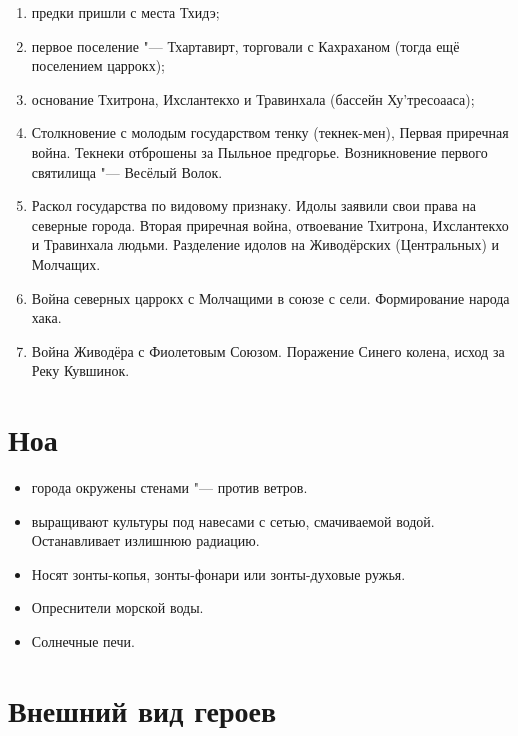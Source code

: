\documentclass[a4paper,10pt,fleqn]{book}
\begin{document}
\begin{enumerate}
\item предки пришли с места Тхидэ;
\item первое поселение "--- Тхартавирт, торговали с Кахраханом (тогда ещё поселением царрокх);
\item основание Тхитрона, Ихслантекхо и Травинхала (бассейн Ху'тресоааса);
\item Столкновение с молодым государством тенку (текнек-мен), Первая приречная война.
Текнеки отброшены за Пыльное предгорье.
Возникновение первого святилища "--- Весёлый Волок.
\item Раскол государства по видовому признаку.
Идолы заявили свои права на северные города.
Вторая приречная война, отвоевание Тхитрона, Ихслантекхо и Травинхала людьми.
Разделение идолов на Живодёрских (Центральных) и Молчащих.
\item Война северных царрокх с Молчащими в союзе с сели.
Формирование народа хака.
\item Война Живодёра с Фиолетовым Союзом.
Поражение Синего колена, исход за Реку Кувшинок.
\end{enumerate}

\section{Ноа}

\begin{itemize}
\item города окружены стенами "--- против ветров.
\item выращивают культуры под навесами с сетью, смачиваемой водой.
Останавливает излишнюю радиацию.
\item Носят зонты-копья, зонты-фонари или зонты-духовые ружья.
\item Опреснители морской воды.
\item Солнечные печи.
\end{itemize}

\section{Внешний вид героев}
\end{document}
